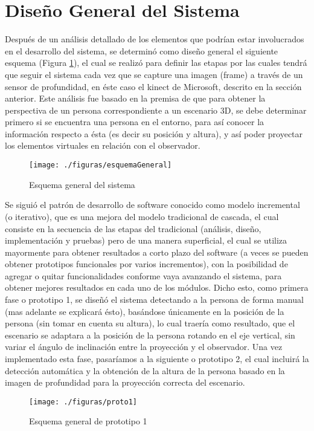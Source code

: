 \documentclass[a4paper,openright,12pt]{report}
\begin{document}
\section{Diseño General del Sistema}
Después de un análisis detallado de los elementos que podrían estar involucrados en el desarrollo del sistema, se determinó como diseño general el siguiente esquema (Figura \ref{fig:esquemaGeneral}), el cual se realizó para definir las etapas por las cuales tendrá que seguir el sistema cada vez que se capture una imagen (frame) a través de un sensor de profundidad, en éste caso el kinect de Microsoft\textcopyright, descrito en la sección anterior. Este análisis fue basado en la premisa de que para obtener la perspectiva de un persona correspondiente a un escenario 3D, se debe determinar primero si se encuentra una persona en el entorno, para así conocer la información respecto a ésta (es decir su posición y altura), y así poder proyectar los elementos virtuales en relación con el observador.\\
\begin{figure}[th]
	\centering
	\texttt{[image: ./figuras/esquemaGeneral]}
	\caption{Esquema general del sistema} \label{fig:esquemaGeneral}
\end{figure}
Se siguió el patrón de desarrollo de software conocido como modelo incremental (o iterativo), que es una mejora del modelo tradicional de cascada, el cual consiste en la secuencia de las etapas del tradicional (análisis, diseño,  implementación y pruebas) pero de una manera superficial, el cual se utiliza mayormente para obtener resultados a corto plazo del software (a veces se pueden obtener prototipos funcionales por varios incrementos), con la posibilidad de agregar o quitar funcionalidades conforme vaya avanzando el sistema, para obtener mejores resultados en cada uno de los módulos. Dicho esto, como primera fase o prototipo 1, se diseñó el sistema detectando a la persona de forma manual (mas adelante se explicará ésto), basándose únicamente en la posición de la persona (sin tomar en cuenta su altura), lo cual traería como resultado, que el escenario se adaptara a la posición de la persona rotando en el eje vertical, sin variar el ángulo de inclinación entre la proyección y el observador. Una vez implementado esta fase, pasaríamos a la siguiente o prototipo 2, el cual incluirá la detección automática y la obtención de la altura de la persona basado en la imagen de profundidad para la proyección correcta del escenario.
\begin{figure}[th]
	\centering
	\texttt{[image: ./figuras/proto1]}
	\caption{Esquema general de prototipo 1} \label{fig:proto1}
\end{figure}
\end{document}
